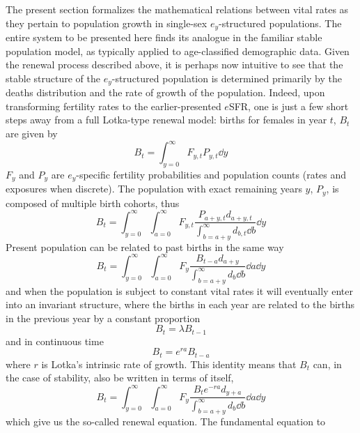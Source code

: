  \FloatBarrier
 \label{sec:ex2sexequation}
The present section formalizes the mathematical relations between vital
rates as they pertain to population growth in single-sex $e_y$-structured
populations. The entire system to be presented here finds its analogue in the
familiar stable population model, as typically applied to age-classified
demographic data. Given the renewal process described above, it is perhaps now
intuitive to see that the stable structure of the $e_y$-structured population is determined
primarily by the deaths distribution and the rate of growth of the
population. Indeed, upon transforming fertility rates to the earlier-presented
$e$SFR, one is just a few short steps away from a full Lotka-type renewal
model: births for females in year $t$, $B_{t}$ are given by
\begin{equation}
B_t = \int_{y=0}^\infty F_{y,t} P_{y,t} \dd y
\end{equation}
$F_y$ and $P_y$ are $e_y$-specific fertility probabilities and population
counts (rates and exposures when discrete). The population with
exact remaining years $y$, $P_y$, is composed of multiple birth cohorts, thus
\begin{equation}
B_t = \int_{y=0}^\infty \int_{a=0}^\infty F_{y,t}
\frac{P_{a+y,t}d_{a+y,t}}{\int_{b=a+y}^\infty d_{b,t} \dd b} \dd y
\end{equation}
Present population can be related to past
births in the same way
\begin{equation}
B_t = \int_{y=0}^\infty \int_{a=0}^\infty F_y
\frac{B_{t-a}d_{a+y}}{\int_{b=a+y}^\infty d_b \dd b} \dd a \dd y
\end{equation}
and when the population is subject to constant vital rates it will eventually
enter into an invariant structure, where the births in each year are related to
the births in the previous year by a constant proportion
\begin{equation}
B_t = \lambda B_{t-1}
\end{equation}
and in continuous time
\begin{equation}
B_t = e^{ra}B_{t-a}
\end{equation}
where $r$ is Lotka's intrinsic rate of growth. This identity means that $B_t$
can, in the case of stability, also be written in terms of itself,
\begin{equation}
\label{eq:exrenewal1sex}
B_t = \int_{y=0}^\infty \int_{a=0}^\infty F_y
\frac{B_{t}e^{-ra}d_{y+a}}{\int_{b=a+y}^\infty d_b \dd b} \dd a \dd y
\end{equation}
which give us the so-called renewal equation. The fundamental equation to
